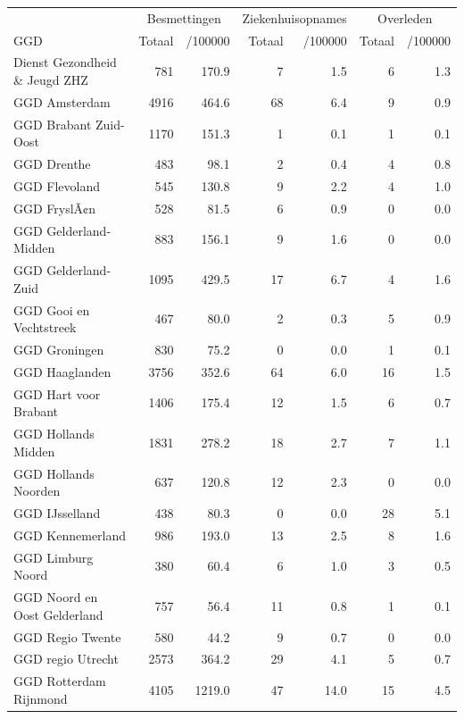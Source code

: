 \documentclass[
  english,
  man,floatsintext]{apa6}
\begin{document}
\begin{table}[H]
\centering\begingroup\fontsize{10}{12}\selectfont

\begin{threeparttable}
\begin{tabular}{lrrrrrr}
\toprule
\multicolumn{1}{c}{ } & \multicolumn{2}{c}{Besmettingen} & \multicolumn{2}{c}{Ziekenhuisopnames} & \multicolumn{2}{c}{Overleden} \\
\cmidrule(l{3pt}r{3pt}){2-3} \cmidrule(l{3pt}r{3pt}){4-5} \cmidrule(l{3pt}r{3pt}){6-7}
GGD & Totaal & /100000 & Totaal & /100000 & Totaal & /100000\\
\midrule
Dienst Gezondheid \& Jeugd ZHZ & 781 & 170.9 & 7 & 1.5 & 6 & 1.3\\
GGD Amsterdam & 4916 & 464.6 & 68 & 6.4 & 9 & 0.9\\
GGD Brabant Zuid-Oost & 1170 & 151.3 & 1 & 0.1 & 1 & 0.1\\
GGD Drenthe & 483 & 98.1 & 2 & 0.4 & 4 & 0.8\\
GGD Flevoland & 545 & 130.8 & 9 & 2.2 & 4 & 1.0\\
GGD FryslÃ¢n & 528 & 81.5 & 6 & 0.9 & 0 & 0.0\\
GGD Gelderland-Midden & 883 & 156.1 & 9 & 1.6 & 0 & 0.0\\
GGD Gelderland-Zuid & 1095 & 429.5 & 17 & 6.7 & 4 & 1.6\\
GGD Gooi en Vechtstreek & 467 & 80.0 & 2 & 0.3 & 5 & 0.9\\
GGD Groningen & 830 & 75.2 & 0 & 0.0 & 1 & 0.1\\
GGD Haaglanden & 3756 & 352.6 & 64 & 6.0 & 16 & 1.5\\
GGD Hart voor Brabant & 1406 & 175.4 & 12 & 1.5 & 6 & 0.7\\
GGD Hollands Midden & 1831 & 278.2 & 18 & 2.7 & 7 & 1.1\\
GGD Hollands Noorden & 637 & 120.8 & 12 & 2.3 & 0 & 0.0\\
GGD IJsselland & 438 & 80.3 & 0 & 0.0 & 28 & 5.1\\
GGD Kennemerland & 986 & 193.0 & 13 & 2.5 & 8 & 1.6\\
GGD Limburg Noord & 380 & 60.4 & 6 & 1.0 & 3 & 0.5\\
GGD Noord en Oost Gelderland & 757 & 56.4 & 11 & 0.8 & 1 & 0.1\\
GGD Regio Twente & 580 & 44.2 & 9 & 0.7 & 0 & 0.0\\
GGD regio Utrecht & 2573 & 364.2 & 29 & 4.1 & 5 & 0.7\\
GGD Rotterdam Rijnmond & 4105 & 1219.0 & 47 & 14.0 & 15 & 4.5\\

\end{tabular}
\end{threeparttable}
\end{table}
\end{document}
